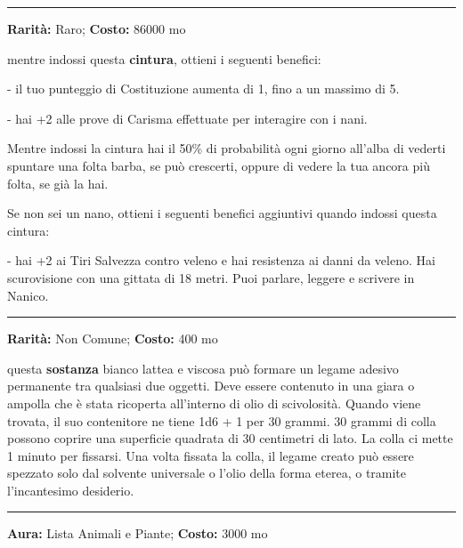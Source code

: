 \begin{multicols}{2}
\smallskip\noindent\rule{\linewidth}{2pt}  \hypertarget{CinturadeiNani}{}\smallskip{}\noindent\label{CinturadeiNani}

\textbf{Rarità:} Raro; \textbf{Costo:} 86000 mo

mentre indossi questa \textbf{cintura}, ottieni i seguenti benefici:

- il tuo punteggio di Costituzione aumenta di 1, fino a un massimo di 5.

- hai +2 alle prove di Carisma effettuate per interagire con i nani.

Mentre indossi la cintura hai il 50\% di probabilità ogni giorno all'alba di vederti spuntare una folta barba, se può crescerti, oppure di vedere la tua ancora più folta, se già la hai.

Se non sei un nano, ottieni i seguenti benefici aggiuntivi quando indossi questa cintura:

- hai +2 ai Tiri Salvezza contro veleno e hai resistenza ai danni da veleno. Hai scurovisione con una gittata di 18 metri. Puoi parlare, leggere e scrivere in Nanico.

\smallskip\noindent\rule{\linewidth}{2pt}  \hypertarget{CollaSuprema}{}\smallskip{}\noindent\label{CollaSuprema}

\textbf{Rarità:} Non Comune; \textbf{Costo:} 400 mo

questa \textbf{sostanza} bianco lattea e viscosa può formare un legame adesivo permanente tra qualsiasi due oggetti. Deve essere contenuto in una giara o ampolla che è stata ricoperta all'interno di olio di scivolosità. Quando viene trovata, il suo contenitore ne tiene 1d6 + 1 per 30 grammi. 30 grammi di colla possono coprire una superficie quadrata di 30 centimetri di lato. La colla ci mette 1 minuto per fissarsi. Una volta fissata la colla, il legame creato può essere spezzato solo dal solvente universale o l'olio della forma eterea, o tramite l'incantesimo desiderio.

\smallskip\noindent\rule{\linewidth}{2pt}  \hypertarget{CollanadelRosario}{}\smallskip{}\noindent\label{CollanadelRosario}

\textbf{Aura:} Lista Animali e Piante; \textbf{Costo:} 3000 mo


\end{multicols}
